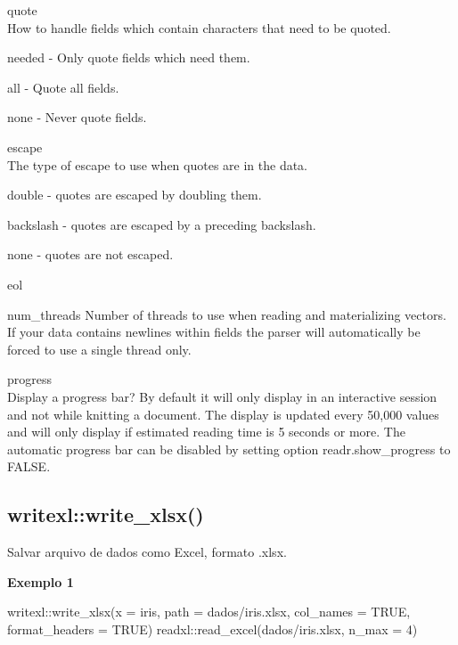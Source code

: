 \documentclass[
]{book}
\newenvironment{Shaded}{\begin{snugshade}}{\end{snugshade}}
\newcommand{\AttributeTok}[1]{\textcolor[rgb]{0.77,0.63,0.00}{#1}}
\newcommand{\ConstantTok}[1]{\textcolor[rgb]{0.00,0.00,0.00}{#1}}
\newcommand{\DecValTok}[1]{\textcolor[rgb]{0.00,0.00,0.81}{#1}}
\newcommand{\FunctionTok}[1]{\textcolor[rgb]{0.00,0.00,0.00}{#1}}
\newcommand{\NormalTok}[1]{#1}
\newcommand{\SpecialCharTok}[1]{\textcolor[rgb]{0.00,0.00,0.00}{#1}}
\newcommand{\StringTok}[1]{\textcolor[rgb]{0.31,0.60,0.02}{#1}}
\theoremstyle{definition}
\theoremstyle{definition}
\theoremstyle{definition}
\theoremstyle{definition}
\theoremstyle{remark}
\begin{document}
quote\\
How to handle fields which contain characters that need to be quoted.

needed - Only quote fields which need them.

all - Quote all fields.

none - Never quote fields.

escape\\
The type of escape to use when quotes are in the data.

double - quotes are escaped by doubling them.

backslash - quotes are escaped by a preceding backslash.

none - quotes are not escaped.

eol

num\_threads
Number of threads to use when reading and materializing vectors. If your data contains newlines within fields the parser will automatically be forced to use a single thread only.

progress\\
Display a progress bar? By default it will only display in an interactive session and not while knitting a document. The display is updated every 50,000 values and will only display if estimated reading time is 5 seconds or more. The automatic progress bar can be disabled by setting option readr.show\_progress to FALSE.

\hypertarget{writexlwrite_xlsx}{%
\subsection{writexl::write\_xlsx()}\label{writexlwrite_xlsx}}

Salvar arquivo de dados como Excel, formato .xlsx.

\textbf{Exemplo 1}

\begin{Shaded}
\begin{Highlighting}[]
\NormalTok{writexl}\SpecialCharTok{::}\FunctionTok{write\_xlsx}\NormalTok{(}\AttributeTok{x =}\NormalTok{ iris,}
                    \AttributeTok{path =} \StringTok{\textquotesingle{}dados/iris.xlsx\textquotesingle{}}\NormalTok{,}
                    \AttributeTok{col\_names =} \ConstantTok{TRUE}\NormalTok{,}
                    \AttributeTok{format\_headers =} \ConstantTok{TRUE}\NormalTok{)}
\NormalTok{readxl}\SpecialCharTok{::}\FunctionTok{read\_excel}\NormalTok{(}\StringTok{\textquotesingle{}dados/iris.xlsx\textquotesingle{}}\NormalTok{, }\AttributeTok{n\_max =} \DecValTok{4}\NormalTok{)}
\end{Highlighting}
\end{Shaded}
\end{document}
